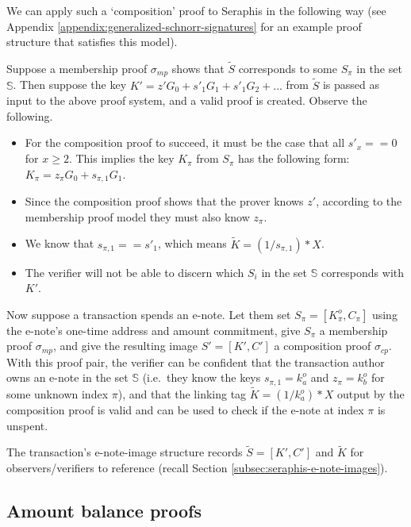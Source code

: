 We can apply such a `composition' proof to Seraphis in the following way (see Appendix \ref{appendix:generalized-schnorr-signatures} for an example proof structure that satisfies this model).

Suppose a membership proof $\sigma_{mp}$ shows that $\tilde{S}$ corresponds to some $S_{\pi}$ in the set $\mathbb{S}$. Then suppose the key $K' = z' G_0 + s'_1 G_1 + s'_1 G_2 + ...$ from $\tilde{S}$ is passed as input to the above proof system, and a valid proof is created. Observe the following.

\begin{itemize}
    \item For the composition proof to succeed, it must be the case that all $s'_x == 0$ for $x \geq 2$. This implies the key $K_{\pi}$ from $S_{\pi}$ has the following form: $K_{\pi} = z_{\pi} G_0 + s_{\pi, 1} G_1$.

    \item Since the composition proof shows that the prover knows $z'$, according to the membership proof model they must also know $z_{\pi}$.

    \item We know that $s_{\pi, 1} == s'_1$, which means $\tilde{K} = (1/ s_{\pi, 1})*X$.

    \item The verifier will not be able to discern which $S_i$ in the set $\mathbb{S}$ corresponds with $K'$.
\end{itemize}

Now suppose a transaction spends an e-note. Let them set $S_{\pi} = [K^o_{\pi}, C_{\pi}]$ using the e-note's one-time address and amount commitment, give $S_{\pi}$ a membership proof $\sigma_{mp}$, and give the resulting image $S' = [K', C']$ a composition proof $\sigma_{cp}$. With this proof pair, the verifier can be confident that the transaction author owns an e-note in the set $\mathbb{S}$ (i.e.\ they know the keys $s_{\pi,1} = k^o_a$ and $z_{\pi} = k^o_b$ for some unknown index $\pi$), and that the linking tag $\tilde{K} = (1/k^o_a)*X$ output by the composition proof is valid and can be used to check if the e-note at index $\pi$ is unspent.

The transaction's e-note-image structure records $\tilde{S} = [K', C']$ and $\tilde{K}$ for observers/verifiers to reference (recall Section \ref{subsec:seraphis-e-note-images}).


\subsection{Amount balance proofs}
\label{subsec:seraphis-amount-balance-proofs}

